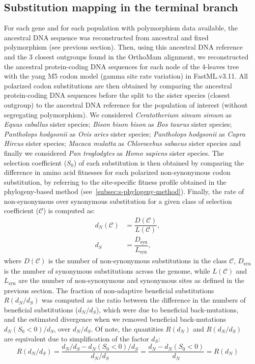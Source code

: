 \documentclass{article}
\newcommand{\dn}{d_N}
\newcommand{\ds}{d_S}
\newcommand{\dnds}{\dn / \ds}
\newcommand{\Sphy}{S_{0}}
\newcommand{\Sphyclass}{\mathcal{C}}
\begin{document}
    \subsection*{Substitution mapping in the terminal branch}
    \label{subsec:substitution-mapping-in-the-terminal-branch}
    For each gene and for each population with polymorphism data available, the ancestral DNA sequence was reconstructed from ancestral and fixed polymorphism (see previous section).
    Then, using this ancestral DNA reference and the $3$ closest outgroups found in the OrthoMam alignment, we reconstructed the ancestral protein-coding DNA sequences for each node of the 4-leaves tree with the yang M5 codon model (gamma site rate variation) in FastML.v3.11\cite{ashkenazy_fastml_2012}.
    All polarized codon substitutions are then obtained by comparing the ancestral protein-coding DNA sequences before the split to the sister species (closest outgroup) to the ancestral DNA reference for the population of interest (without segregating polymorphism).
    We considered \textit{Ceratotherium simum simum} as \textit{Equus caballus} sister species; \textit{Bison bison bison} as \textit{Bos taurus} sister species; \textit{Pantholops hodgsonii} as \textit{Ovis aries} sister species; \textit{Pantholops hodgsonii} as \textit{Capra Hircus} sister species; \textit{Macaca mulatta} as \textit{Chlorocebus sabaeus} sister species and finally we considered \textit{Pan troglodytes} as \textit{Homo sapiens} sister species.
    The selection coefficient ($\Sphy$) of each substitution is then obtained by comparing the difference in amino acid fitnesses for each polarized non-synonymous codon substitution, by referring to the site-specific fitness profile obtained in the phylogeny-based method (see~\ref{subsec:s-phylogeny-method}).
    Finally, the rate of non-synonymous over synonymous substitution for a given class of selection coefficient ($\Sphyclass$) is computed as:
    \begin{align}
        \dn \left( \Sphyclass \right) &= \dfrac{D\left( \Sphyclass \right)}{L \left( \Sphyclass \right)}, \\
        \ds &= \dfrac{D_{\textrm{syn}}}{L_{\textrm{syn}}},
    \end{align}
    where $D \left( \Sphyclass \right) $ is the number of non-synonymous substitutions in the class $\Sphyclass$, $D_{\textrm{syn}}$ is the number of synonymous substitutions across the genome, while $L \left( \Sphyclass \right)$ and $L_{\textrm{syn}}$ are the number of non-synonymous and synonymous sites as defined in the previous section.
    The fraction of non-adaptive beneficial substitutions $R(\dnds)$ was computed as the ratio between the difference in the numbers of beneficial substitutions ($\dnds$), which were due to beneficial back-mutations, and the estimated divergence when we removed beneficial back-mutations $\dn (\Sphy < 0) / \ds$, over $\dnds$.
    Of note, the quantities $R(\dn)$ and $R(\dnds)$ are equivalent due to simplification of the factor $\ds$:
    \begin{equation}
        R(\dnds) = \dfrac{\dnds - \dn(\Sphy < 0) / \ds}{\dnds} = \dfrac{\dn - \dn(\Sphy < 0)}{\dn} = R(\dn)
    \end{equation}

    \printbibliography
\end{document}
